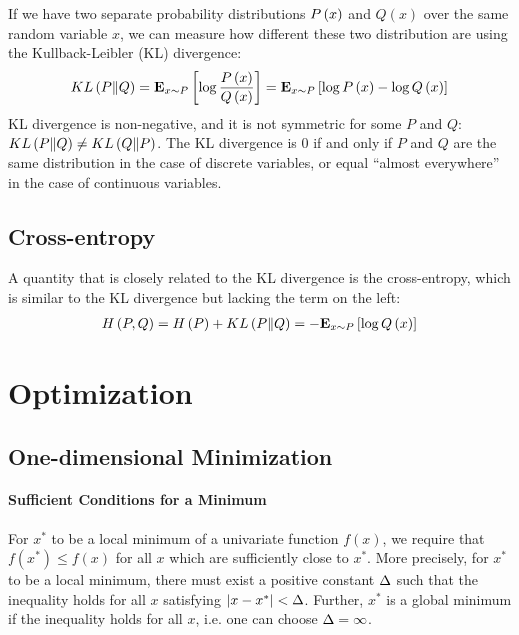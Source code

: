If we have two separate probability distributions $\P{x}$ and $Q\left(x\right)$ over the same random variable $x$, we can measure how different these two distribution are using the Kullback-Leibler (KL) divergence:
\begin{align*}
	\KL{P}{Q}=\Ep{x\sim P}{\log\frac{\P{x}}{Q\left(x\right)}}=\Ep{x\sim P}{\log\P{x}-\log Q\left(x\right)}
\end{align*}
KL divergence is non-negative, and it is not symmetric for some $P$ and $Q$: $\KL{P}{Q}\neq\KL{Q}{P}$. The KL divergence is 0 if and only if $P$ and $Q$ are the same distribution in the case of discrete variables, or equal ``almost everywhere'' in the case of continuous variables.

\subsection{Cross-entropy}

A quantity that is closely related to the KL divergence is the cross-entropy, which is similar to the KL divergence but lacking the term on the left:
\begin{align*}
	\H{P,Q}=\H{P}+\KL{P}{Q}=-\Ep{x\sim P}{\log Q\left(x\right)}
\end{align*}



\section{Optimization}
\label{section2.5}

\subsection{One-dimensional Minimization}

\paragraph{Sufficient Conditions for a Minimum}

For $x^*$ to be a local minimum of a univariate function $f(x)$, we require that $f(x^*)\leq f(x)$ for all $x$ which are sufficiently close to $x^*$. More precisely, for $x^*$ to be a local minimum, there must exist a positive constant $\De$ such that the inequality holds for all $x$ satisfying $\ab{x-x^*}<\De$. Further, $x^*$ is a global minimum if the inequality holds for all $x$, i.e. one can choose $\De=\infty$.

